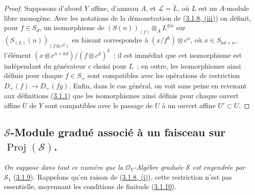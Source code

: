 \begin{proof}
Supposons d'abord $Y$ affine, d'anneau $A$, et
$\mathcal{L}=\widetilde{L}$, où $L$ est un $A$-module libre monogène. Avec les
notations de la démonstration de
(\hyperref[II.3.1.8-fr]{3.1.8, (iii)}) on définit, pour $f\in S_d$, un
isomorphisme de $(S(n))_{(f)}\otimes_A L^{\otimes n}$ sur
$(S_{(L)}(n))_{(f\otimes c^d)}$ en faisant correspondre à
$(x/f^k)\otimes c^n$, où $x\in S_{kd+n}$, l'élément
$(x\otimes c^{n+kd})/(f\otimes c^d)^k$~; il est immédiat
que cet isomorphisme est indépendant du générateur $c$ choisi pour $L$~; en
outre, les isomorphismes ainsi définis pour chaque $f\in S_+$ sont compatibles
avec les opérations de restriction $D_+(f)\to D_+(fg)$. Enfin, dans le cas
général, on voit sans peine en revenant aux définitions
(\hyperref[II.3.1.1-fr]{3.1.1}) que les isomorphismes ainsi définis pour
chaque ouvert affine $U$ de $Y$ sont compatibles avec le passage de $U$ à un
ouvert affine $U'\subset U$.
\end{proof}

\subsection{$\mathcal{S}$-Module gradué associé à un faisceau sur
$\operatorname{Proj}(\mathcal{S})$.}
\label{subsection:II.3.3-fr}

\emph{On suppose dans tout ce numéro que la $\mathcal{O}_Y$-Algèbre graduée
$\mathcal{S}$ est engendrée par $\mathcal{S}_1$}
(\hyperref[II.3.1.9-fr]{3.1.9}). Rappelons qu'en raison de
(\hyperref[II.3.1.8-fr]{3.1.8, (i)}), cette restriction n'est pas essentielle,
moyennant les conditions de finitude (\hyperref[II.3.1.10-fr]{3.1.10}).


